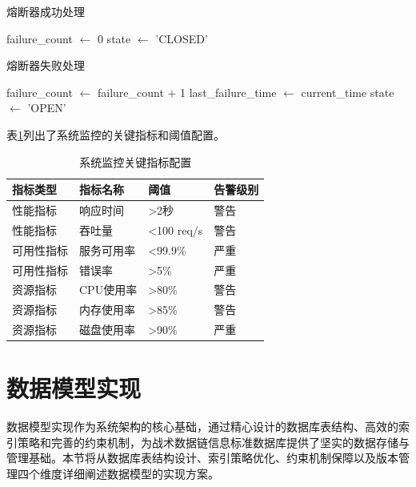 \begin{algorithm}[H]
\caption{熔断器成功处理}
\begin{algorithmic}[1]
\STATE failure\_count $\leftarrow$ 0
\STATE state $\leftarrow$ 'CLOSED'
\end{algorithmic}
\end{algorithm}

\begin{algorithm}[H]
\caption{熔断器失败处理}
\begin{algorithmic}[1]
\STATE failure\_count $\leftarrow$ failure\_count + 1
\STATE last\_failure\_time $\leftarrow$ current\_time
    \STATE state $\leftarrow$ 'OPEN'
\ENDIF
\end{algorithmic}
\end{algorithm}

表\ref{table:monitoring_metrics}列出了系统监控的关键指标和阈值配置。

\begin{table}[H]
    \caption{系统监控关键指标配置}
    \label{table:monitoring_metrics}
    \centering
    \begin{tabular}{|l|l|l|l|}
        \hline
        \textbf{指标类型} & \textbf{指标名称} & \textbf{阈值} & \textbf{告警级别} \\
        \hline
        性能指标 & 响应时间 & >2秒 & 警告 \\
        性能指标 & 吞吐量 & <100 req/s & 警告 \\
        可用性指标 & 服务可用率 & <99.9\% & 严重 \\
        可用性指标 & 错误率 & >5\% & 严重 \\
        资源指标 & CPU使用率 & >80\% & 警告 \\
        资源指标 & 内存使用率 & >85\% & 警告 \\
        资源指标 & 磁盘使用率 & >90\% & 严重 \\
        \hline
    \end{tabular}
\end{table}

\section{数据模型实现}

数据模型实现作为系统架构的核心基础，通过精心设计的数据库表结构、高效的索引策略和完善的约束机制，为战术数据链信息标准数据库提供了坚实的数据存储与管理基础。本节将从数据库表结构设计、索引策略优化、约束机制保障以及版本管理四个维度详细阐述数据模型的实现方案。


